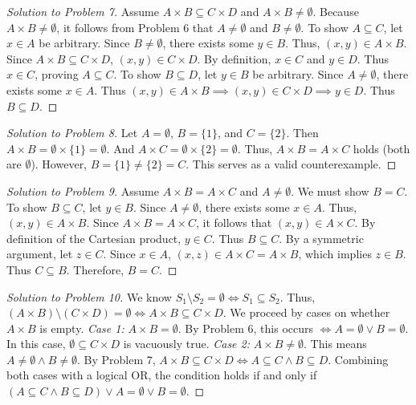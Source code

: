 \documentclass[11pt]{article}
\begin{document}
\begin{proof}[Solution to Problem 7]
Assume $A \times B \subseteq C \times D$ and $A \times B \neq \emptyset$. 
Because $A \times B \neq \emptyset$, it follows from Problem 6 that $A \neq \emptyset$ and $B \neq \emptyset$.
To show $A \subseteq C$, let $x \in A$ be arbitrary. Since $B \neq \emptyset$, there exists some $y \in B$. Thus, $(x,y) \in A \times B$. Since $A \times B \subseteq C \times D$, $(x,y) \in C \times D$. By definition, $x \in C$ and $y \in D$. Thus $x \in C$, proving $A \subseteq C$.
To show $B \subseteq D$, let $y \in B$ be arbitrary. Since $A \neq \emptyset$, there exists some $x \in A$. Thus $(x,y) \in A \times B \implies (x,y) \in C \times D \implies y \in D$. Thus $B \subseteq D$.
\end{proof}

\begin{proof}[Solution to Problem 8]
Let $A = \emptyset$, $B = \{1\}$, and $C = \{2\}$. 
Then $A \times B = \emptyset \times \{1\} = \emptyset$.
And $A \times C = \emptyset \times \{2\} = \emptyset$.
Thus, $A \times B = A \times C$ holds (both are $\emptyset$). However, $B = \{1\} \neq \{2\} = C$. This serves as a valid counterexample.
\end{proof}

\begin{proof}[Solution to Problem 9]
Assume $A \times B = A \times C$ and $A \neq \emptyset$. We must show $B = C$.
To show $B \subseteq C$, let $y \in B$. Since $A \neq \emptyset$, there exists some $x \in A$. Thus, $(x,y) \in A \times B$. Since $A \times B = A \times C$, it follows that $(x,y) \in A \times C$. By definition of the Cartesian product, $y \in C$. Thus $B \subseteq C$.
By a symmetric argument, let $z \in C$. Since $x \in A$, $(x,z) \in A \times C = A \times B$, which implies $z \in B$. Thus $C \subseteq B$.
Therefore, $B = C$.
\end{proof}

\begin{proof}[Solution to Problem 10]
We know $S_1 \setminus S_2 = \emptyset \iff S_1 \subseteq S_2$. 
Thus, $(A \times B) \setminus (C \times D) = \emptyset \iff A \times B \subseteq C \times D$.
We proceed by cases on whether $A \times B$ is empty.
\textit{Case 1:} $A \times B = \emptyset$. By Problem 6, this occurs $\iff A = \emptyset \lor B = \emptyset$. In this case, $\emptyset \subseteq C \times D$ is vacuously true.
\textit{Case 2:} $A \times B \neq \emptyset$. This means $A \neq \emptyset \land B \neq \emptyset$. By Problem 7, $A \times B \subseteq C \times D \iff A \subseteq C \land B \subseteq D$.
Combining both cases with a logical OR, the condition holds if and only if $(A \subseteq C \land B \subseteq D) \lor A = \emptyset \lor B = \emptyset$.
\end{proof}
\end{document}

